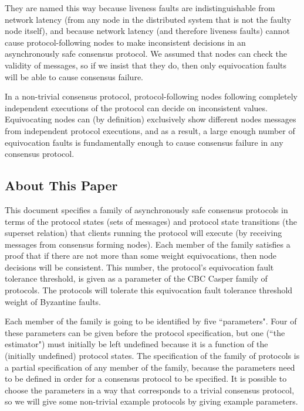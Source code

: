 \documentclass{article}
\theoremstyle{definition}
\begin{document}
They are named this way because liveness faults are indistinguishable from network latency (from any node in the distributed system that is not the faulty node itself), and because network latency (and therefore liveness faults) cannot cause protocol-following nodes to make inconsistent decisions in an asynchronously safe consensus protocol. We assumed that nodes can check the validity of messages, so if we insist that they do, then only equivocation faults will be able to cause consensus failure.

In a non-trivial consensus protocol, protocol-following nodes following completely independent executions of the protocol can decide on inconsistent values. Equivocating nodes can (by definition) exclusively show different nodes messages from independent protocol executions, and as a result, a large enough number of equivocation faults is fundamentally enough to cause consensus failure in any consensus protocol.

\subsection{About This Paper}

This document specifies a family of asynchronously safe consensus protocols in terms of the protocol states (sets of messages) and protocol state transitions (the superset relation) that clients running the protocol will execute (by receiving messages from consensus forming nodes). Each member of the family satisfies a proof that if there are not more than some weight equivocations, then node decisions will be consistent. This number, the protocol's equivocation fault tolerance threshold, is given as a parameter of the CBC Casper family of protocols. The protocols will tolerate this equivocation fault tolerance threshold weight of Byzantine faults.

Each member of the family is going to be identified by five ``parameters". Four of these parameters can be given before the protocol specification, but one (``the estimator") must initially be left undefined because it is a function of the (initially undefined) protocol states. The specification of the family of protocols is a partial specification of any member of the family, because the parameters need to be defined in order for a consensus protocol to be specified. It is possible to choose the parameters in a way that corresponds to a trivial consensus protocol, so we will give some non-trivial example protocols by giving example parameters.
\end{document}
